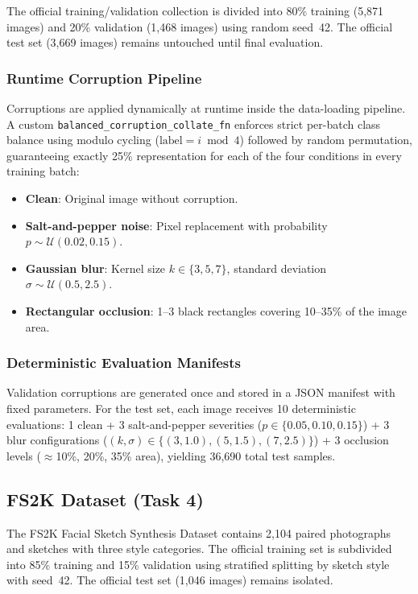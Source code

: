 \documentclass[conference]{IEEEtran}
\begin{document}
The official training/validation collection is divided into 80\% training (5,871 images) and 20\% validation (1,468 images) using random seed~42. The official test set (3,669 images) remains untouched until final evaluation.

\subsubsection{Runtime Corruption Pipeline}
Corruptions are applied dynamically at runtime inside the data-loading pipeline. A custom \texttt{balanced\_corruption\_collate\_fn} enforces strict per-batch class balance using modulo cycling ($\text{label} = i \bmod 4$) followed by random permutation, guaranteeing exactly 25\% representation for each of the four conditions in every training batch:

\begin{itemize}
    \item \textbf{Clean}: Original image without corruption.
    \item \textbf{Salt-and-pepper noise}: Pixel replacement with probability $p \sim \mathcal{U}(0.02, 0.15)$.
    \item \textbf{Gaussian blur}: Kernel size $k \in \{3, 5, 7\}$, standard deviation $\sigma \sim \mathcal{U}(0.5, 2.5)$.
    \item \textbf{Rectangular occlusion}: 1--3 black rectangles covering 10--35\% of the image area.
\end{itemize}

\subsubsection{Deterministic Evaluation Manifests}
Validation corruptions are generated once and stored in a JSON manifest with fixed parameters. For the test set, each image receives 10 deterministic evaluations: 1 clean + 3 salt-and-pepper severities ($p \in \{0.05, 0.10, 0.15\}$) + 3 blur configurations ($(k,\sigma) \in \{(3,1.0), (5,1.5), (7,2.5)\}$) + 3 occlusion levels ($\approx$10\%, 20\%, 35\% area), yielding 36,690 total test samples.

\subsection{FS2K Dataset (Task 4)}

The FS2K Facial Sketch Synthesis Dataset contains 2,104 paired photographs and sketches with three style categories. The official training set is subdivided into 85\% training and 15\% validation using stratified splitting by sketch style with seed~42. The official test set (1,046 images) remains isolated.
\end{document}
